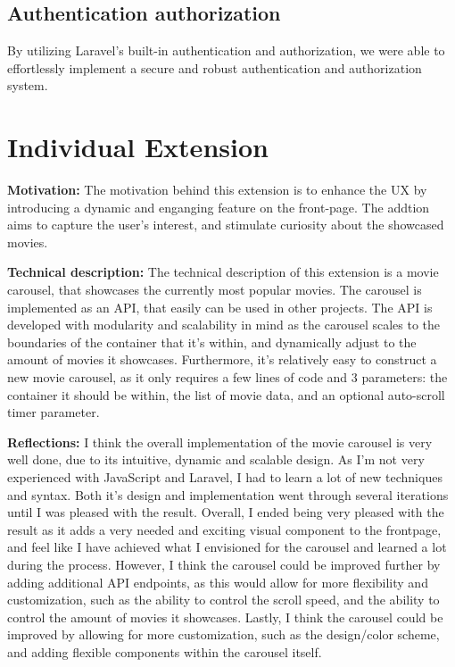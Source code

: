 \documentclass[letterpaper,twocolumn]{article}
\begin{document}
\subsection{Authentication authorization} %
By utilizing Laravel's built-in authentication and authorization, we were able to effortlessly implement a secure and robust authentication and authorization system.

\section{Individual Extension}
\textbf{Motivation:} %
The motivation behind this extension is to enhance the UX by introducing a dynamic and enganging feature on the front-page. The addtion aims to capture the user's interest, and stimulate curiosity about the showcased movies.

\textbf{Technical description:} %
The technical description of this extension is a movie carousel, that showcases the currently most popular movies. 
The carousel is implemented as an API, that easily can be used in other projects. 
The API is developed with modularity and scalability in mind as the carousel scales to the boundaries of the container that it's within, and dynamically adjust to the amount of movies it showcases. 
Furthermore, it's relatively easy to construct a new movie carousel, as it only requires a few lines of code and 3 parameters: the container it should be within, the list of movie data, and an optional auto-scroll timer parameter.

\textbf{Reflections:} %
I think the overall implementation of the movie carousel is very well done, due to its intuitive, dynamic and scalable design. 
As I'm not very experienced with JavaScript and Laravel, I had to learn a lot of new techniques and syntax. 
Both it's design and implementation went through several iterations until I was pleased with the result. 
Overall, I ended being very pleased with the result as it adds a very needed and exciting visual component to the frontpage, and feel like I have achieved what I envisioned for the carousel and learned a lot during the process.
However, I think the carousel could be improved further by adding additional API endpoints, as this would allow for more flexibility and customization, such as the ability to control the scroll speed, and the ability to control the amount of movies it showcases. 
Lastly, I think the carousel could be improved by allowing for more customization, such as the design/color scheme, and adding flexible components within the carousel itself.
\end{document}
